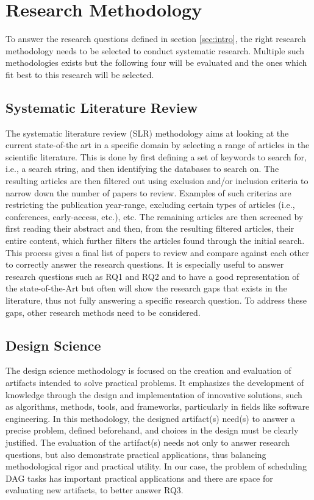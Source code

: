 
\section{Research Methodology}
\label{sec:methodology}

To answer the research questions defined in section \ref{sec:intro},
the right research methodology needs to be selected to conduct 
systematic research.
Multiple such methodologies exists but the following four will be evaluated
and the ones which fit best to this research will be selected.

\subsection{Systematic Literature Review}

The systematic literature review (SLR) methodology aims at
looking at the current state-of-the art in a specific domain by selecting a range 
of articles in the scientific literature\cite{KITCHENHAM2009SLR}.
This is done by first defining a set of keywords to search for, i.e., a search string, 
and then identifying the databases to search on.
The resulting articles are then filtered out using exclusion and/or inclusion criteria
to narrow down the number of papers to review.
Examples of such criterias are restricting the publication year-range,
excluding certain types of articles (i.e., conferences, early-access, etc.), etc.
The remaining articles are then screened by first reading 
their abstract and then, from the resulting filtered articles, their entire content,
which further filters the articles found through the initial search.
This process gives a final list of papers to review and compare against each other 
to correctly answer the research questions. 
It is especially useful to answer research questions such as RQ1 and RQ2
and to have a good representation of the state-of-the-Art
but often will show the research gaps that exists in the literature,
thus not fully answering a specific research question.
To address these gaps, other research methods need to be considered.

\subsection{Design Science}

The design science methodology is focused on the creation and evaluation 
of artifacts intended to solve practical problems. It emphasizes 
the development of knowledge through the design and implementation 
of innovative solutions, such as algorithms, methods, tools, 
and frameworks, particularly in fields like software engineering\cite{Wieringa2010DesignScienceMethod}.
In this methodology,
the designed artifact(s) need(s) to answer a precise problem,
defined beforehand, and choices in the design must be clearly justified.
The evaluation of the artifact(s) needs not only to answer research questions, but also
demonstrate practical applications,
thus balancing methodological rigor and practical utility.
In our case, the problem of scheduling DAG tasks
has important practical applications and there are space 
for evaluating new artifacts, to better answer RQ3.


